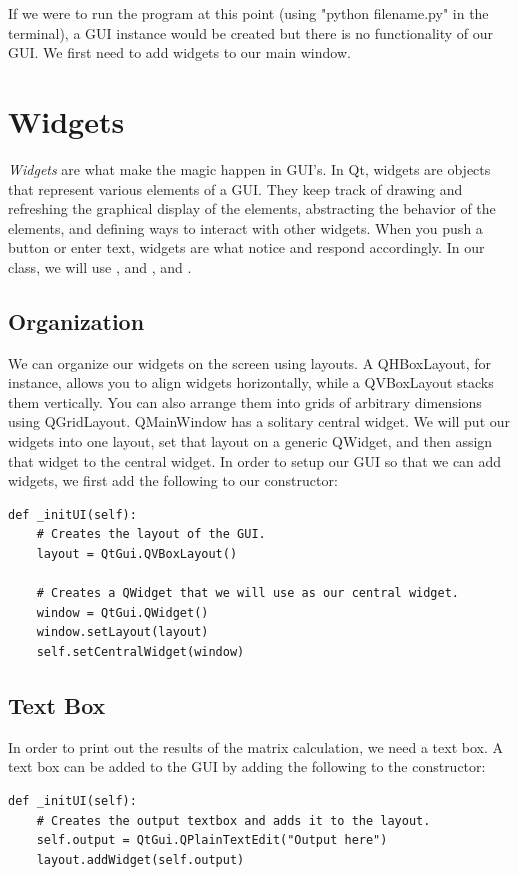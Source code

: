 If we were to run the program at this point (using "python filename.py" in the terminal), a GUI instance would be created but there is no functionality of our GUI.  We first need to add widgets to our main window.

\section*{Widgets}
\emph{Widgets} are what make the magic happen in GUI's.
In Qt, widgets are objects that represent various elements of a GUI.
They keep track of drawing and refreshing the graphical display of the elements, abstracting the behavior of the elements, and defining ways to interact with other widgets.
When you push a button or enter text, widgets are what notice and respond accordingly.
In our  class, we will use , and , and .

\subsection*{Organization}
We can organize our widgets on the screen using layouts.  A QHBoxLayout, for instance, allows you to align widgets horizontally, while a QVBoxLayout stacks them vertically.  You can also arrange them into grids of arbitrary dimensions using QGridLayout.  QMainWindow has a solitary central widget.  We will put our widgets into one layout, set that layout on a generic QWidget, and then assign that widget to the central widget.  In order to setup our GUI so that we can add widgets, we first add the following to our constructor: 
\begin{lstlisting}
def _initUI(self):
	# Creates the layout of the GUI.
	layout = QtGui.QVBoxLayout()

	# Creates a QWidget that we will use as our central widget.
	window = QtGui.QWidget()
	window.setLayout(layout)
	self.setCentralWidget(window)
\end{lstlisting}

\subsection*{Text Box}
In order to print out the results of the matrix calculation, we need a text box.  A text box can be added to the GUI by adding the following to the constructor:
\begin{lstlisting}
def _initUI(self):
	# Creates the output textbox and adds it to the layout.
	self.output = QtGui.QPlainTextEdit("Output here")
	layout.addWidget(self.output)
	
\end{lstlisting}


